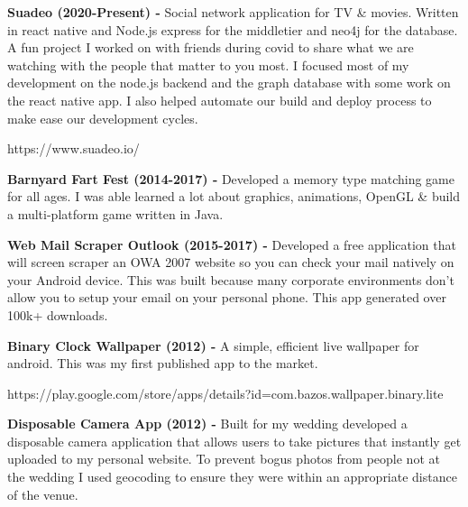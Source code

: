 \documentclass[a4paper,online]{adcv}
\begin{document}
\begin{adcvtabletwo}
  \textbf{Suadeo (2020-Present) - }
  Social network application for TV \& movies. Written in react native and Node.js express for the middletier and neo4j for the database. A fun project I worked on with friends during covid to share what we are watching with the people that matter to you most. I focused most of my development on the node.js backend and the graph database with some work on the react native app. I also helped automate our build and deploy process to make ease our development cycles.
  
  https://www.suadeo.io/

  \adcvrowskip
  
  \textbf{Barnyard Fart Fest (2014-2017) - }
  Developed a memory type matching game for all ages. I was able learned a lot about graphics, animations, OpenGL \& build a multi-platform game written in Java.
  
  \adcvrowskip
  
  \textbf{Web Mail Scraper Outlook (2015-2017) - }
  Developed a free application that will screen scraper an OWA 2007 website so you can check your mail natively on your Android device. This was built because many corporate environments don’t allow you to setup your email on your personal phone. This app generated over 100k+ downloads.
  
  \adcvrowskip
  
  \textbf{Binary Clock Wallpaper (2012) - }
  A simple, efficient live wallpaper for android. This was my first published app to the market.
  
  https://play.google.com/store/apps/details?id=com.bazos.wallpaper.binary.lite
  
  \adcvrowskip

  \textbf{Disposable Camera App (2012) - }
  Built for my wedding developed a disposable camera application that allows users to take pictures that instantly get uploaded to my personal website. To prevent bogus photos from people not at the wedding I used geocoding to ensure they were within an appropriate distance of the venue.
\end{adcvtabletwo}
\end{document}
